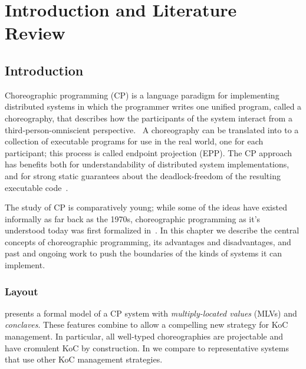 \chapter{Introduction and Literature Review}

\section{Introduction}
\label{sec:introduction}

Choreographic programming (CP)
is a language paradigm for implementing distributed systems in which the programmer writes one unified program, called a choreography,
that describes how the participants of the system interact
from a third-person-omniscient perspective.~
A choreography can be translated into to a collection of executable programs for use in the real world, one for each participant;
this process is called endpoint projection (EPP).
The CP approach has benefits both for understandability of distributed system implementations,
and for strong static guarantees about the deadlock-freedom of the resulting executable code~\cite{montesi-carbone-dfbd}.

The study of CP is comparatively young; while some of the ideas have existed informally as far back as the 1970s,
choreographic programming as it's understood today was first formalized in~.
In this chapter we describe the central concepts of choreographic programming,
its advantages and disadvantages,
and past and ongoing work to push the boundaries of the kinds of systems it can implement.

\subsection{Layout}

 presents
a formal model of a CP system with
\emph{multiply-located values} (MLVs)
and \emph{conclaves}.
These features combine to allow a compelling new strategy for KoC management.
In particular, all well-typed \HLSCentral choreographies are projectable and have cromulent KoC by construction.
In  we compare \HLSCentral to representative systems that use other KoC management strategies.

